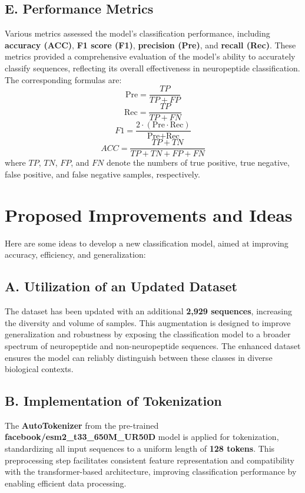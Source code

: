 \documentclass[conference]{IEEEtran}
\begin{document}
\subsection*{E. Performance Metrics}
Various metrics assessed the model's classification performance, including \textbf{accuracy (ACC)}, \textbf{F1 score (F1)}, \textbf{precision (Pre)}, and \textbf{recall (Rec)}. These metrics provided a comprehensive evaluation of the model's ability to accurately classify sequences, reflecting its overall effectiveness in neuropeptide classification. The corresponding formulas are:
\begin{equation}
\text{Pre} = \frac{TP}{TP + FP}
\end{equation}
\begin{equation}
\text{Rec} = \frac{TP}{TP + FN}
\end{equation}
\begin{equation}
F1 = \frac{2 \cdot (\text{Pre} \cdot \text{Rec})}{\text{Pre} + \text{Rec}}
\end{equation}
\begin{equation}
ACC = \frac{TP + TN}{TP + TN + FP + FN}
\end{equation}
where \(TP\), \(TN\), \(FP\), and \(FN\) denote the numbers of true positive, true negative, false positive, and false negative samples, respectively.

\section{Proposed Improvements and Ideas}

Here are some ideas to develop a new classification model, aimed at improving accuracy, efficiency, and generalization:

\subsection*{A. Utilization of an Updated Dataset} 
The dataset has been updated with an additional \textbf{2,929 sequences}, increasing the diversity and volume of samples. This augmentation is designed to improve generalization and robustness by exposing the classification model to a broader spectrum of neuropeptide and non-neuropeptide sequences. The enhanced dataset ensures the model can reliably distinguish between these classes in diverse biological contexts.

\subsection*{B. Implementation of Tokenization}
The \textbf{AutoTokenizer} from the pre-trained \textbf{facebook/esm2\_t33\_650M\_UR50D} model is applied for tokenization, standardizing all input sequences to a uniform length of \textbf{128 tokens}. This preprocessing step facilitates consistent feature representation and compatibility with the transformer-based architecture, improving classification performance by enabling efficient data processing.
\end{document}
